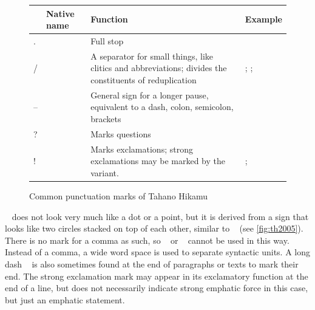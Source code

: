 \begin{figure}[htp]
\caption{Common punctuation marks of Tahano Hikamu}
\begin{tabu} to 
\toprule
\tableheaderfont

	& Native name
	& Function
	& Example
	\\
	
\toprule

.
	& 
	& Full stop
	& 
	\\
	
\midrule

/
	& 
	& A separator for small things, like clitics and abbreviations; 
		divides the constituents of reduplication
	& ; %
		; %
	\\
	
\midrule

–
	& 
	& General sign for a longer pause, equivalent to a dash, 
		colon, semicolon, brackets 
	& 
	\\

\midrule

?
	& 
	& Marks questions
	& 
	\\

\midrule

!
	& 
	& Marks exclamations; strong exclamations may be marked by the  
		variant.
	& ; %
	\\

\bottomrule
\end{tabu}
\label{fig:thpunctcom}
\end{figure}

~ does not look very much like a dot or a point, but it is 
derived from a sign that looks like two circles stacked on top of each other, 
similar to \ayr{/}~\orth{-} (see \autoref{fig:th2005}). There is no mark for a 
comma as such, so \ayr{/}~\orth{-} or ~\orth{--} cannot be 
used in this way. Instead of a comma, a wide word space is used to separate 
syntactic units. A long dash ~\orth{---} is also sometimes found at the 
end of paragraphs or texts to mark their end. The strong 
exclamation mark  may appear in its exclamatory function at the end 
of a line, but does not necessarily indicate strong emphatic force in this 
case, but just an emphatic statement.

